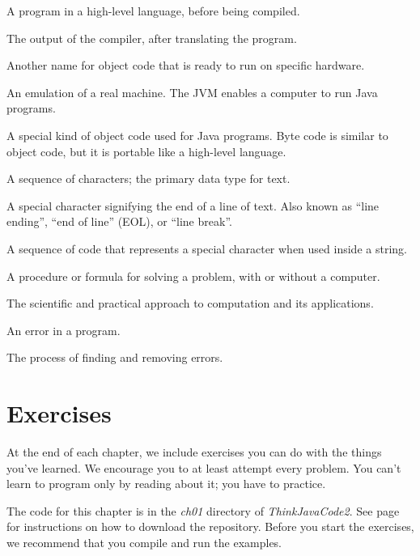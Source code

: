 \begin{description}
A program in a high-level language, before being compiled.

The output of the compiler, after translating the program.

Another name for object code that is ready to run on specific hardware.

An emulation of a real machine. The JVM enables a computer to run Java programs.

A special kind of object code used for Java programs.
Byte code is similar to object code, but it is portable like a high-level language.

A sequence of characters; the primary data type for text.

A special character signifying the end of a line of text.
Also known as ``line ending'', ``end of line'' (EOL), or ``line break''.


A sequence of code that represents a special character when used inside a string.

A procedure or formula for solving a problem, with or without a computer.

The scientific and practical approach to computation and its applications.

An error in a program.

The process of finding and removing errors.

\end{description}


\section{Exercises}

At the end of each chapter, we include exercises you can do with the things you've learned.
We encourage you to at least attempt every problem.
You can't learn to program only by reading about it; you have to practice.

The code for this chapter is in the {\it ch01} directory of {\it ThinkJavaCode2}.
See page~\pageref{code} for instructions on how to download the repository.
Before you start the exercises, we recommend that you compile and run the examples.

